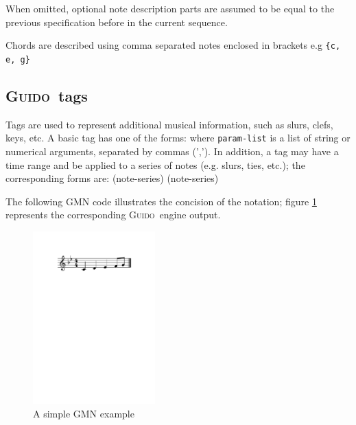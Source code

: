 \documentclass[twoside,10pt,a4paper]{article}
\newenvironment{gmncode}		{\vspace{-2mm}\small\verbatim}{\endverbatim\vspace{-2mm}}
\newcommand{\Guido}		{\textsc{Guido}}
\newcommand{\code}[1]		{{\small \texttt{#1}}}
\begin{document}
When omitted, optional note description parts are assumed to be equal to the previous specification before in the current sequence.

Chords are described using comma separated notes enclosed in brackets e.g \code{\{c, e, g\}}

\subsection{\Guido\ tags}
Tags are used to represent additional musical information, such as slurs, clefs, keys, etc. A basic tag has one of the forms:
\begin{gmncode} 
   \tagname 
\end{gmncode}
\noindent where \code{param-list} is a list of string or numerical arguments, separated by commas (','). In addition, a tag may have a time range and be applied to a series of notes (e.g. slurs, ties, etc.); the corresponding forms are:
\begin{gmncode} 
   \tagname(note-series)
   (note-series)
\end{gmncode} 

The following GMN code illustrates the concision of the notation; figure \ref{ex1} represents the corresponding \Guido\ engine output. 
\begin{gmncode} 
  [ \meter<"4/4"> \key<-2> c d e& f/8 g ]
\end{gmncode} 

\begin{figure}[h]
	\centering \includegraphics[width=47mm]{imgs/ex1}
 \caption{A simple GMN example}
 \label{ex1}
\end{figure}
\end{document}
